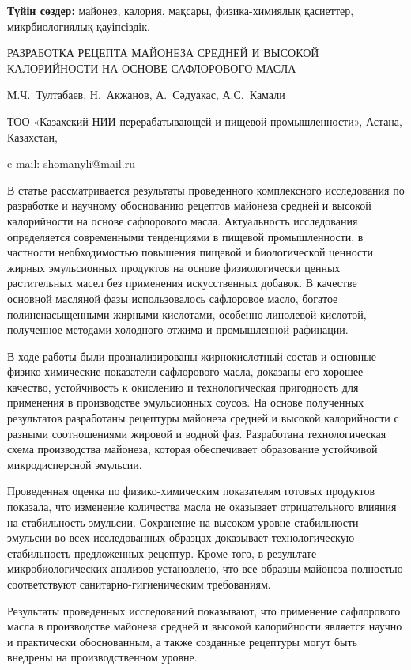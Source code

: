 {\bfseries Түйін сөздер:} майонез, калория, мақсары, физика-химиялық
қасиеттер, микрбиологиялық қауіпсіздік.

\begin{header}
РАЗРАБОТКА РЕЦЕПТА МАЙОНЕЗА СРЕДНЕЙ И ВЫСОКОЙ КАЛОРИЙНОСТИ НА ОСНОВЕ САФЛОРОВОГО МАСЛА

М.Ч.~Тултабаев\envelope,
Н.~Акжанов,
А.~Сәдуакас,
А.С.~Камали
\end{header}

\begin{affil}
ТОО «Казахский НИИ перерабатывающей и пищевой промышленности», Астана, Казахстан,

e-mail: shomanyli@mail.ru
\end{affil}

В статье рассматривается результаты проведенного комплексного
исследования по разработке и научному обоснованию рецептов майонеза
средней и высокой калорийности на основе сафлорового масла. Актуальность
исследования определяется современными тенденциями в пищевой
промышленности, в частности необходимостью повышения пищевой и
биологической ценности жирных эмульсионных продуктов на основе
физиологически ценных растительных масел без применения искусственных
добавок. В качестве основной масляной фазы использовалось сафлоровое
масло, богатое полиненасыщенными жирными кислотами, особенно линолевой
кислотой, полученное методами холодного отжима и промышленной рафинации.

В ходе работы были проанализированы жирнокислотный состав и основные
физико-химические показатели сафлорового масла, доказаны его хорошее
качество, устойчивость к окислению и технологическая пригодность для
применения в производстве эмульсионных соусов. На основе полученных
результатов разработаны рецептуры майонеза средней и высокой
калорийности с разными соотношениями жировой и водной фаз. Разработана
технологическая схема производства майонеза, которая обеспечивает
образование устойчивой микродисперсной эмульсии.

Проведенная оценка по физико-химическим показателям готовых продуктов
показала, что изменение количества масла не оказывает отрицательного
влияния на стабильность эмульсии. Сохранение на высоком уровне
стабильности эмульсии во всех исследованных образцах доказывает
технологическую стабильность предложенных рецептур. Кроме того, в
результате микробиологических анализов установлено, что все образцы
майонеза полностью соответствуют санитарно-гигиеническим требованиям.

Результаты проведенных исследований показывают, что применение
сафлорового масла в производстве майонеза средней и высокой калорийности
является научно и практически обоснованным, а также созданные рецептуры
могут быть внедрены на производственном уровне.

